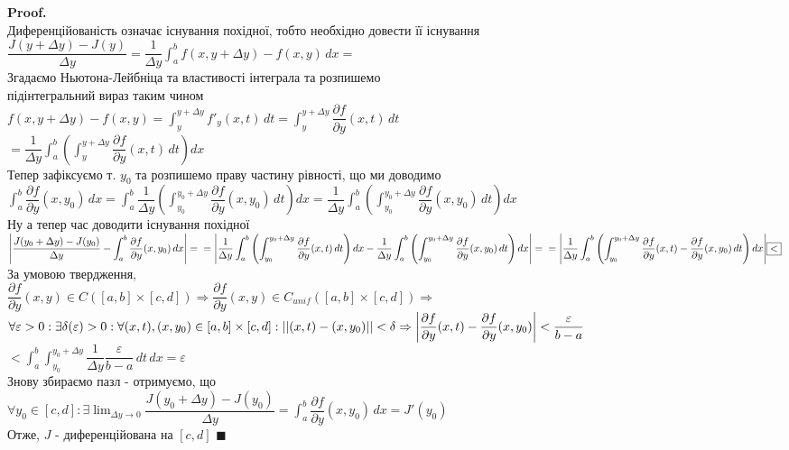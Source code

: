 \documentclass[a4paper, 14pt]{extarticle}
\def\huge{\displaystyle}
\theoremstyle{theoremdd}
\theoremstyle{theoremdd}
\theoremstyle{theoremdd}
\theoremstyle{theoremdd}
\theoremstyle{theoremdd}
\theoremstyle{theoremdd}
\theoremstyle{theoremdd}
\theoremstyle{theoremdd}
\newenvironment{pf}{\vspace*{-3mm} \textbf{Proof. \\}}{$\blacksquare$}
\def\departial#1#2{\dfrac{\partial {#1}}{\partial {#2}}}
\begin{document}
\begin{pf}
Диференційованість означає існування похідної, тобто необхідно довести її існування\\
$\dfrac{J(y+\Delta y) - J(y)}{\Delta y} = \dfrac{1}{\Delta y} \huge \int_a^b f(x,y+\Delta y) - f(x,y)\,dx \boxed{=}$\\
Згадаємо Ньютона-Лейбніца та властивості інтеграла та розпишемо \\ підінтегральний вираз таким чином\\
$f(x,y+\Delta y) - f(x,y) = \huge\int_y^{y+\Delta y} f'_y(x,t)\,dt = \int_y^{y+\Delta y} \departial{f}{y}(x,t)\,dt$\\
$\boxed{=} \huge \dfrac{1}{\Delta y} \int_a^b \left( \int_y^{y+\Delta y} \departial{f}{y}(x,t)\,dt \right)dx$\\
Тепер зафіксуємо т. $y_0$ та розпишемо праву частину рівності, що ми доводимо\\
$\huge \int_a^b \departial{f}{y}(x,y_0)\,dx = \int_a^b \dfrac{1}{\Delta y} \left( \int_{y_0}^{y_0+\Delta y} \departial{f}{y}(x,y_0) \,dt \right)dx = \dfrac{1}{\Delta y} \int_a^b \left( \int_{y_0}^{y_0+\Delta y} \departial{f}{y}(x,y_0) \,dt \right)dx$\\
Ну а тепер час доводити існування похідної\\
$\huge \abs{\dfrac{J(y_0+\Delta y) - J(y_0)}{\Delta y} - \huge\int_a^b \departial{f}{y}(x,y_0)\,dx} = \\
= \abs{\dfrac{1}{\Delta y} \int_a^b \left( \int_{y_0}^{y_0+\Delta y} \departial{f}{y}(x,t)\,dt \right)dx - \dfrac{1}{\Delta y} \int_a^b \left( \int_{y_0}^{y_0+\Delta y} \departial{f}{y}(x,y_0) \,dt \right)dx} = \\
= \abs{\dfrac{1}{\Delta y} \int_a^b \left( \int_{y_0}^{y_0 + \Delta y} \departial{f}{y}(x,t) - \departial{f}{y}(x,y_0) \,dt \right)dx} \boxed{<}$\\
За умовою твердження, \\ $\departial{f}{y}(x,y) \in C([a,b] \times [c,d]) \Rightarrow \departial{f}{y}(x,y) \in C_{unif}([a,b] \times [c,d]) \Rightarrow$\\
$\forall \varepsilon > 0: \exists \delta(\varepsilon) > 0: \forall (x,t),(x,y_0) \in [a,b]\times [c,d]: ||(x,t)-(x,y_0)|| < \delta \Rightarrow \abs{\departial{f}{y}(x,t) - \departial{f}{y}(x,y_0)} < \dfrac{\varepsilon}{b-a}$\\
$\boxed{<} \huge\int_a^b \int_{y_0}^{y_0+\Delta y} \dfrac{1}{\Delta y} \dfrac{\varepsilon}{b-a} \,dt \,dx = \varepsilon$\\
Знову збираємо пазл - отримуємо, що\\
$\forall y_0 \in [c,d]: \exists \huge \lim_{\Delta y \to 0} \dfrac{J(y_0+\Delta y)-J(y_0)}{\Delta y} = \int_a^b \departial{f}{y}(x,y_0)\,dx = J'(y_0)$\\
Отже, $J$ - диференційована на $[c,d]$
\end{pf}
\end{document}
